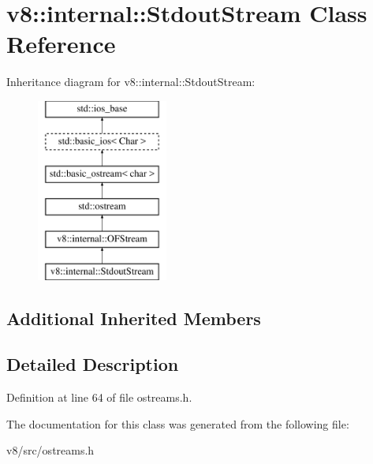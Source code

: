 \hypertarget{classv8_1_1internal_1_1StdoutStream}{}\section{v8\+:\+:internal\+:\+:Stdout\+Stream Class Reference}
\label{classv8_1_1internal_1_1StdoutStream}
Inheritance diagram for v8\+:\+:internal\+:\+:Stdout\+Stream\+:\begin{figure}[H]
\begin{center}
\leavevmode
\includegraphics[height=6.000000cm]{classv8_1_1internal_1_1StdoutStream}
\end{center}
\end{figure}
\subsection*{Additional Inherited Members}


\subsection{Detailed Description}


Definition at line 64 of file ostreams.\+h.



The documentation for this class was generated from the following file\+:\begin{DoxyCompactItemize}
\item 
v8/src/ostreams.\+h\end{DoxyCompactItemize}
